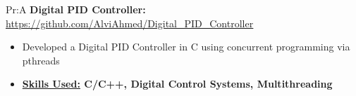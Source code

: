 
Pr:A
\vspace{\spaces}
\textbf{Digital PID Controller: } \underline{\url{https://github.com/AlviAhmed/Digital_PID_Controller}}
\begin{itemize}[noitemsep,nolistsep]
\item Developed a Digital PID Controller in C using concurrent programming via pthreads
\item \textbf{ \underline{Skills Used:} C/C++, Digital Control Systems, Multithreading}
\end{itemize}

